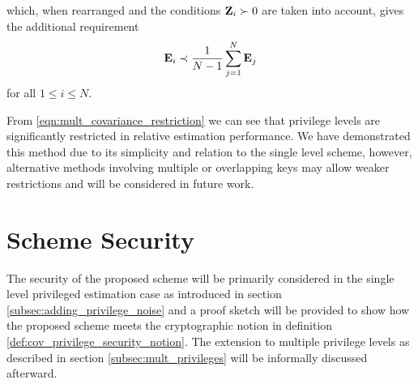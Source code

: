 \documentclass[letterpaper, 10 pt, conference]{ieeeconf}
\begin{document}
which, when rearranged and the conditions ${{\mathbf{Z}}}_i\succ 0$ are taken into account, gives the additional requirement
\begin{equation}\label{eqn:mult_covariance_restriction}
   {\ensuremath{{\mathbf{E}}}}_i \prec \frac{1}{N-1}\sum_{j=1}^{N}{{\mathbf{E}}}_j
\end{equation}
for all $1 \leq i \leq N$.

From \eqref{eqn:mult_covariance_restriction} we can see that privilege levels are significantly restricted in relative estimation performance. We have demonstrated this method due to its simplicity and relation to the single level scheme, however, alternative methods involving multiple or overlapping keys may allow weaker restrictions and will be considered in future work.

% 
%                                                                                        
%                                                                                        
%                                                                                        
% 

\section{Scheme Security}\label{sec:scheme_security}
The security of the proposed scheme will be primarily considered in the single level privileged estimation case as introduced in section \ref{subsec:adding_privilege_noise} and a proof sketch will be provided to show how the proposed scheme meets the cryptographic notion in definition \ref{def:cov_privilege_security_notion}. The extension to multiple privilege levels as described in section \ref{subsec:mult_privileges} will be informally discussed afterward.

% 
% 
\end{document}

